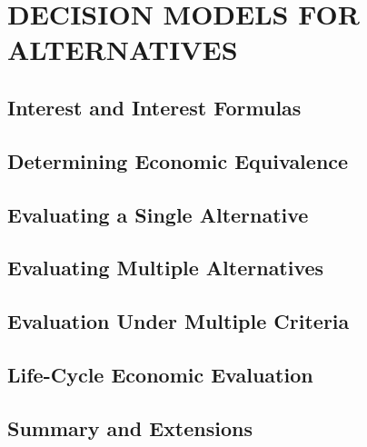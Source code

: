 \chapter{DECISION MODELS FOR ALTERNATIVES}\label{chap:11}

\section{Interest and Interest Formulas}


\section{Determining Economic Equivalence}


\section{Evaluating a Single Alternative}


\section{Evaluating Multiple Alternatives}


\section{Evaluation Under Multiple Criteria}


\section{Life-Cycle Economic Evaluation}


\section{Summary and Extensions}


\begin{exercises}
    \begin{exercise}
    \label{sea-11-1}
    
    \end{exercise}
    \begin{solution}
    \end{solution}

\end{exercises}
